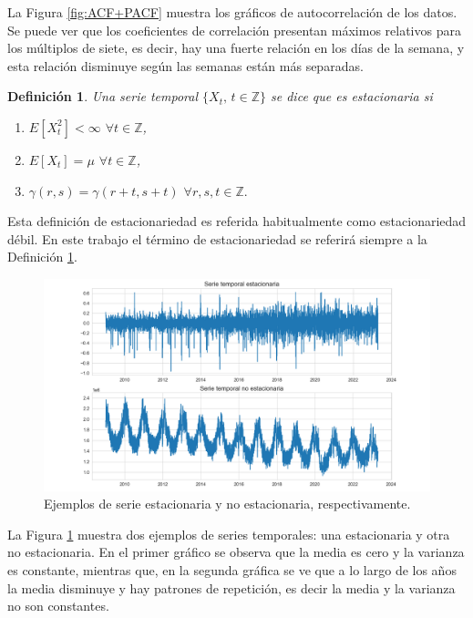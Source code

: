 \documentclass[12pt,twoside]{article}
\newtheorem{definition}[theorem]{Definición}
\begin{document}
La Figura \ref{fig:ACF+PACF} muestra los gráficos de autocorrelación de los datos. Se puede ver que los coeficientes de correlación presentan máximos relativos para los múltiplos de siete, es decir, hay una fuerte relación en los días de la semana, y esta relación disminuye según las semanas están más separadas.




\begin{definition}\label{def:stationarity}
    Una serie temporal $\{X_t,\, t \in \mathbb{Z}\}$ se dice que es estacionaria si 
    \begin{enumerate}
        \item $E[X_t^2] <\infty$ $\forall t \in \mathbb{Z}$,
        \item $E[X_t] = \mu$ $\forall t \in \mathbb{Z}$,
        \item $\gamma(r,s) = \gamma(r+t, s+t)$ $\forall r,s,t \in \mathbb{Z}.$
    \end{enumerate}
\end{definition}

Esta definición de estacionariedad es referida habitualmente como estacionariedad débil. En este trabajo el término de estacionariedad se referirá siempre a la Definición \ref{def:stationarity}.


\begin{figure}[h]
\includegraphics[width = \textwidth]{imagenes/Stationarity.png}
\caption{Ejemplos de serie estacionaria y no estacionaria, respectivamente.}\label{fig:Stationarity}
\end{figure}

La Figura \ref{fig:Stationarity} muestra dos ejemplos de series temporales: una estacionaria y otra no estacionaria. En el primer gráfico se observa que la media es cero y la varianza es constante, mientras que, en la segunda gráfica se ve que a lo largo de los años la media disminuye y hay patrones de repetición, es decir la media y la varianza no son constantes.
\end{document}
